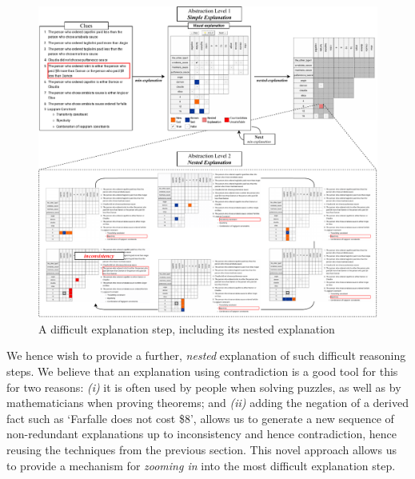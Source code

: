 \begin{figure}[t!]
	\centering
     \includegraphics[width=\linewidth]{figures/aijournal_ijcai_demo-aijournal_other_explanation.pdf}
    \caption{A difficult explanation step, including its nested explanation}\label{fig:pasta_diff}
\end{figure}

We hence wish to provide a further, \textit{nested} explanation of such difficult reasoning steps. We believe that an explanation using contradiction is a good tool for this for two reasons: \emph{(i)} it is often used by people when solving puzzles, as well as by mathematicians when proving theorems; and \emph{(ii)} adding the negation of a derived fact such as `Farfalle does not cost \$8', allows us to generate a new sequence of non-redundant explanations up to inconsistency and hence contradiction, hence reusing the techniques from the previous section. 
This novel approach allows us to provide a mechanism for \emph{zooming in} into the most difficult explanation step.




